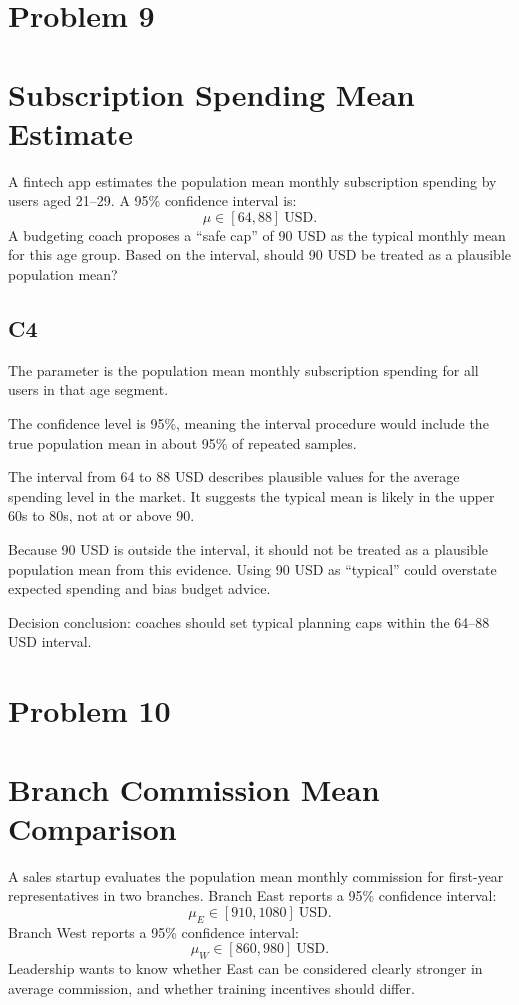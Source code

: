 \begin{ExamProblems}
		\newpage
		\item
		\section{Problem 9}
		\section{Subscription Spending Mean Estimate}
		A fintech app estimates the population mean monthly subscription spending by users aged 21--29.
		A 95\% confidence interval is:
		\[
		\mu \in [64, 88]\ \text{USD}.
		\]
		A budgeting coach proposes a ``safe cap'' of 90 USD as the typical monthly mean for this age group.
		Based on the interval, should 90 USD be treated as a plausible population mean?

		\subsection*{C4}
		The parameter is the population mean monthly subscription spending for all users in that age segment.

		The confidence level is 95\%, meaning the interval procedure would include the true population mean in about 95\% of repeated samples.

		The interval from 64 to 88 USD describes plausible values for the average spending level in the market.
		It suggests the typical mean is likely in the upper 60s to 80s, not at or above 90.

		Because 90 USD is outside the interval, it should not be treated as a plausible population mean from this evidence.
		Using 90 USD as ``typical'' could overstate expected spending and bias budget advice.

		Decision conclusion: coaches should set typical planning caps within the 64--88 USD interval.

		\newpage
		\item
		\section{Problem 10}
		\section{Branch Commission Mean Comparison}
		A sales startup evaluates the population mean monthly commission for first-year representatives in two branches.
		Branch East reports a 95\% confidence interval:
		\[
		\mu_E \in [910, 1080]\ \text{USD}.
		\]
		Branch West reports a 95\% confidence interval:
		\[
		\mu_W \in [860, 980]\ \text{USD}.
		\]
		Leadership wants to know whether East can be considered clearly stronger in average commission, and whether training incentives should differ.


\end{ExamProblems}
